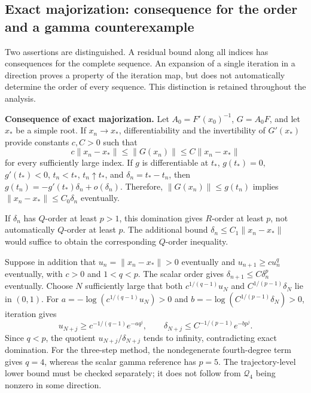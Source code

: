 \documentclass[11pt,a4paper]{article}
\numberwithin{equation}{section}
\numberwithin{table}{section}
\theoremstyle{plain}
\theoremstyle{definition}\newtheorem{definition}[theorem]{Definition}
\theoremstyle{remark}\newtheorem{remark}[theorem]{Remark}
\begin{document}
\subsection{Exact majorization: consequence for the order and a gamma counterexample}
\label{supp:exact-obstruction}

Two assertions are distinguished. A residual bound along all indices
has consequences for the complete sequence. An expansion of a single
iteration in a direction proves a property of the iteration map, but
does not automatically determine the order of every sequence. This distinction is retained throughout the analysis.

\noindent\textbf{Consequence of exact majorization.}
Let $A_0=F'(x_0)^{-1}$, $G=A_0F$, and let $x_*$ be a simple root.
If $x_n\to x_*$, differentiability and the invertibility of $G'(x_*)$
provide constants $c,C>0$ such that
\[
 c\|x_n-x_*\|\leq\|G(x_n)\|\leq C\|x_n-x_*\|
\]
for every sufficiently large index. If $g$ is differentiable at $t_*$,
$g(t_*)=0$, $g'(t_*)<0$, $t_n<t_*$, $t_n\uparrow t_*$, and
$\delta_n=t_*-t_n$, then
$g(t_n)=-g'(t_*)\delta_n+o(\delta_n)$.
Therefore, $\|G(x_n)\|\leq g(t_n)$ implies
$\|x_n-x_*\|\leq C_0\delta_n$ eventually.

If $\delta_n$ has $Q$-order at least $p>1$, this domination gives
$R$-order at least $p$, not automatically $Q$-order at least $p$.
The additional bound $\delta_n\leq C_1\|x_n-x_*\|$ would suffice
to obtain the corresponding $Q$-order inequality.

Suppose in addition that $u_n=\|x_n-x_*\|>0$ eventually and
$u_{n+1}\geq c u_n^q$ eventually, with $c>0$ and $1<q<p$.
The scalar order gives $\delta_{n+1}\leq C\delta_n^p$ eventually.
Choose $N$ sufficiently large that both
$c^{1/(q-1)}u_N$ and $C^{1/(p-1)}\delta_N$ lie in $(0,1)$.
For $a=-\log(c^{1/(q-1)}u_N)>0$ and
$b=-\log(C^{1/(p-1)}\delta_N)>0$, iteration gives
\[
 u_{N+j}\geq c^{-1/(q-1)}e^{-a q^j},\qquad
 \delta_{N+j}\leq C^{-1/(p-1)}e^{-b p^j}.
\]
Since $q<p$, the quotient $u_{N+j}/\delta_{N+j}$ tends to infinity,
contradicting exact domination. For the three-step method, the
nondegenerate fourth-degree term gives $q=4$, whereas the scalar
gamma reference has $p=5$. The trajectory-level lower bound must
be checked separately; it does not follow from $\mathcal Q_4$ being
nonzero in some direction.
\end{document}
